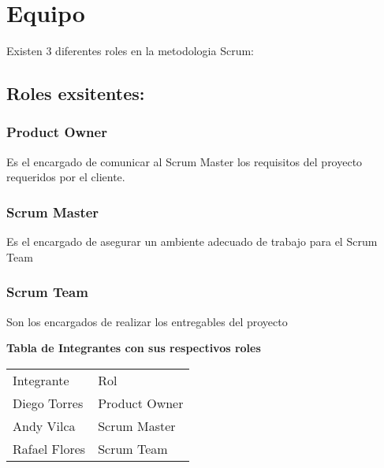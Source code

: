 \chapter{Equipo}

\vspace {-0.50 cm}
Existen 3 diferentes roles en la metodologia Scrum:
\section{Roles exsitentes: }
\subsection{Product Owner}
Es el encargado de comunicar al Scrum Master los requisitos del proyecto requeridos por el cliente.
\vspace{-0.20 cm}
\subsection{Scrum Master}
Es el encargado de asegurar un ambiente adecuado de trabajo para el Scrum Team
\vspace{-0.20 cm}
\subsection{Scrum Team}
Son los encargados de realizar los entregables del proyecto
\vspace{0.50 cm}

\textbf {Tabla de Integrantes con sus respectivos roles}
\begin{table}[htbp]
	\begin{center}
		\begin{tabular}{|l|l|}
			\hline
			\rowcolor{gray!50}
			\hline
			\multicolumn{2}{|c|}{Scrum} \\ 
			\hline\hline
			\rowcolor{gray!50} Integrante & Rol\\  \hline
			\hline
			Diego Torres & Product Owner \\ \hline
			Andy Vilca & Scrum Master \\ \hline
			Rafael Flores & Scrum Team \\ \hline
		\end{tabular}
	\end{center}
\end{table}